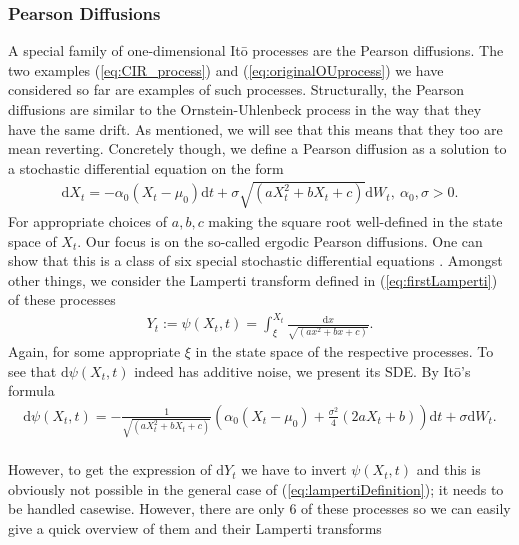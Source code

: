 \subsubsection{Pearson Diffusions}
A special family of one-dimensional Itō processes are the Pearson diffusions. The two examples (\ref{eq:CIR_process}) and (\ref{eq:originalOUprocess}) we have considered so far are examples of such processes. Structurally, the Pearson diffusions are similar to the Ornstein-Uhlenbeck process in the way that they have the same drift. As mentioned, we will see that this means that they too are mean reverting. Concretely though, we define a Pearson diffusion as a solution to a stochastic differential equation on the form
\begin{align}
    \mathrm{d}X_t = -\alpha_0 \left(X_t - \mu_0\right)\mathrm{d}t + \sigma\sqrt{\left(aX_t^2 + bX_t + c\right)}\mathrm{d}W_t, \: \alpha_0, \sigma > 0. \label{eq:pearsonDiffusion}
\end{align}
For appropriate choices of $a, b, c$ making the square root well-defined in the state space of $X_t$. Our focus is on the so-called ergodic Pearson diffusions. One can show that this is a class of six special stochastic differential equations \cite[p.36]{StatisticalMethodsForSDE}. Amongst other things, we consider the Lamperti transform defined in (\ref{eq:firstLamperti}) of these processes
\begin{align}
    Y_t := \psi\left(X_t, t\right) = \int_{\xi}^{X_t} \frac{\mathrm{d}x}{\sqrt{\left(ax^2 + bx + c\right)}}. \label{eq:lampertiDefinition}
\end{align}
Again, for some appropriate $\xi$ in the state space of the respective processes. To see that $\mathrm{d}\psi\left(X_t, t\right)$ indeed has additive noise, we present its SDE. By Itō's formula
\begin{align}
    \mathrm{d}\psi\left(X_t, t\right) = - \frac{1}{\sqrt{\left(aX_t^2 + bX_t + c\right)}}\left(\alpha_0\left(X_t - \mu_0\right) + \frac{\sigma^2}{4}\left(2aX_t + b\right)\right)\mathrm{d}t + \sigma \mathrm{d}W_t.
\end{align}\\
However, to get the expression of $\mathrm{d}Y_t$ we have to invert $\psi\left(X_t, t\right)$ and this is obviously not possible in the general case of (\ref{eq:lampertiDefinition}); it needs to be handled casewise. However, there are only 6 of these processes so we can easily give a quick overview of them \cite[p.36]{StatisticalMethodsForSDE} and their Lamperti transforms
